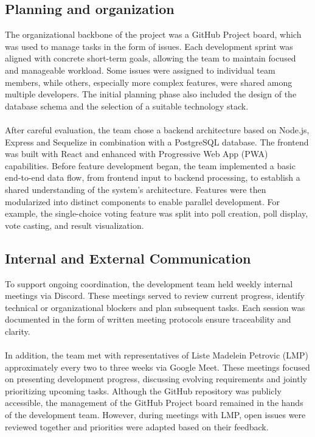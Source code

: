 \documentclass[a4paper,12pt]{report}
\begin{document}
\subsection{Planning and organization}
The organizational backbone of the project was a GitHub Project board, which was used to manage tasks in the form of issues. Each development sprint was aligned with concrete short-term goals, allowing the team to maintain focused and manageable workload. Some issues were assigned to individual team members, while others, especially more complex features, were shared among multiple developers. The initial planning phase also included the design of the database schema and the selection of a suitable technology stack.\\\\
After careful evaluation, the team chose a backend architecture based on Node.js, Express and Sequelize in combination with a PostgreSQL database. The frontend was built with React and enhanced with Progressive Web App (PWA) capabilities. Before feature development began, the team implemented a basic end-to-end data flow, from frontend input to backend processing, to establish a shared understanding of the system's architecture. Features were then modularized into distinct components to enable parallel development. For example, the single-choice voting feature was split into poll creation, poll display, vote casting, and result visualization.
\subsection{Internal and External Communication}
To support ongoing coordination, the development team held weekly internal meetings via Discord. These meetings served to review current progress, identify technical or organizational blockers and plan subsequent tasks. Each session was documented in the form of written meeting protocols ensure traceability and clarity.\\\\
In addition, the team met with representatives of Liste Madelein Petrovic (LMP) approximately every two to three weeks via Google Meet. These meetings focused on presenting development progress, discussing evolving requirements and jointly prioritizing upcoming tasks. Although the GitHub repository was publicly accessible, the management of the GitHub Project board remained in the hands of the development team. However, during meetings with LMP, open issues were reviewed together and priorities were adapted based on their feedback.
\end{document}
